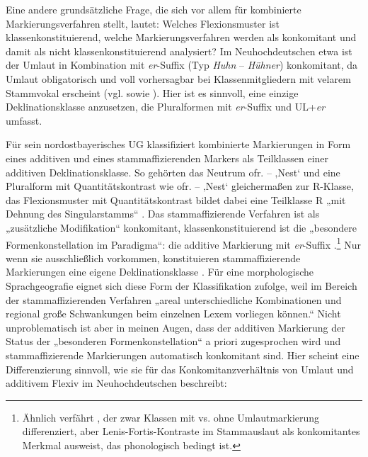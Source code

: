 Eine andere grundsätzliche Frage, die sich vor allem für kombinierte Markierungsverfahren stellt, lautet: Welches Flexionsmuster ist klassenkonstituierend, welche Markierungsverfahren werden als konkomitant und damit als nicht klassenkonstituierend analysiert? Im Neuhochdeutschen etwa ist der Umlaut in Kombination mit \textit{er}{}-Suffix (Typ \textit{Huhn} -- \textit{Hühner}) konkomitant, da Umlaut obligatorisch und voll vorhersagbar bei Klassenmitgliedern mit velarem Stammvokal erscheint (vgl. \citealt[69]{Dammel2018} sowie ). Hier ist es sinnvoll, eine einzige Deklinationsklasse anzusetzen, die Pluralformen mit \textit{er}{}-Suffix und UL+\textit{er} umfasst.

Für sein nordostbayerisches UG klassifiziert \citet{Rowley1997} kombinierte Markierungen in Form eines additiven und eines stammaffizierenden Markers als Teilklassen einer additiven Deklinationsklasse. So gehörten das Neutrum ofr.  --  ‚Nest‘ und eine Pluralform mit Quantitätskontrast wie ofr.  --  ‚Nest‘ gleichermaßen zur R-Klasse, das Flexionsmuster mit Quantitätskontrast bildet dabei eine Teilklasse R „mit Dehnung des Singularstamms“ \citep[164]{Rowley1997}. Das stammaffizierende Verfahren ist als „zusätzliche Modifikation“ konkomitant, klassenkonstituierend ist die „besondere Formenkonstellation im Paradigma“: die additive Markierung mit \textit{er}{}-Suffix \citep[145]{Rowley1997}.\footnote{Ähnlich verfährt \citet[41]{White1966}, der zwar Klassen mit vs. ohne Umlautmarkierung differenziert, aber Lenis-Fortis-Kontraste im Stammauslaut als konkomitantes Merkmal ausweist, das phonologisch bedingt ist.} Nur wenn sie ausschließlich vorkommen, konstituieren stammaffizierende Markierungen eine eigene Deklinationsklasse \citep[144]{Rowley1997}. Für eine morphologische Sprachgeografie eignet sich diese Form der Klassifikation \citet[145]{Rowley1997} zufolge, weil im Bereich der stammaffizierenden Verfahren „areal unterschiedliche Kombinationen und regional große Schwankungen beim einzelnen Lexem vorliegen können.“ Nicht unproblematisch ist aber in meinen Augen, dass der additiven Markierung der Status der „besonderen Formenkonstellation“ a priori zugesprochen wird und stammaffizierende Markierungen automatisch konkomitant sind. Hier scheint eine Differenzierung sinnvoll, wie sie \citet[65--66]{Dammel2018} für das Konkomitanzverhältnis von Umlaut und additivem Flexiv im Neuhochdeutschen beschreibt:

